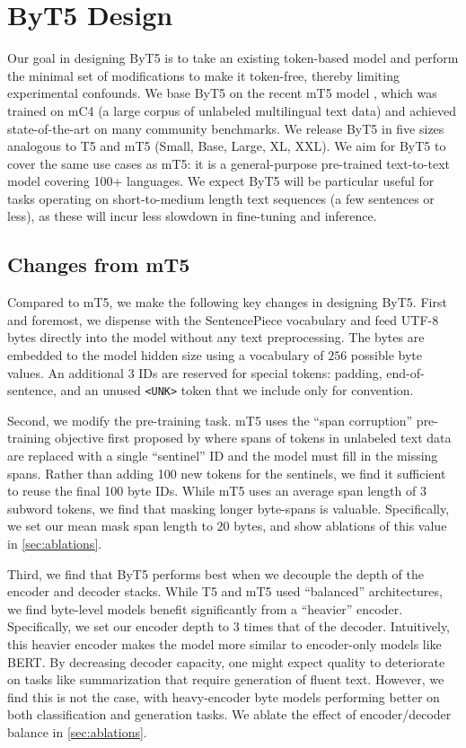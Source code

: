 \documentclass[11pt,a4paper]{article}
\begin{document}
\section{ByT5 Design}
\label{sec:byt5}

Our goal in designing ByT5 is to take an existing token-based model and perform the minimal set of modifications to make it token-free, thereby limiting experimental confounds.
We base ByT5 on the recent mT5 model \cite{mt5}, which was trained on mC4 (a large corpus of unlabeled multilingual text data) and achieved state-of-the-art on many community benchmarks.
We release ByT5 in five sizes analogous to T5 and mT5 (Small, Base, Large, XL, XXL).
We aim for ByT5 to cover the same use cases as mT5: it is a general-purpose pre-trained text-to-text model covering 100+ languages.
We expect ByT5 will be particular useful for tasks operating on short-to-medium length text sequences (a few sentences or less), as these will incur less slowdown in fine-tuning and inference.

\subsection{Changes from mT5}

Compared to mT5, we make the following key changes in designing ByT5. First and foremost, we dispense with the SentencePiece \cite{kudo-richardson-2018-sentencepiece} vocabulary and feed \mbox{UTF-8} bytes directly into the model without any text preprocessing. The bytes are embedded to the model hidden size using a vocabulary of $256$ possible byte values. An additional $3$ IDs are reserved for special tokens: padding, end-of-sentence, and an unused \texttt{<UNK>} token that we include only for convention.

Second, we modify the pre-training task.
mT5 uses the ``span corruption'' pre-training objective first proposed by \citet{raffel-2020-t5} where spans of tokens in unlabeled text data are replaced with a single ``sentinel'' ID and the model must fill in the missing spans.
Rather than adding 100 new tokens for the sentinels, we find it sufficient to reuse the final 100 byte IDs.
While mT5 uses an average span length of $3$ subword tokens, we find that masking longer byte-spans is valuable.
Specifically, we set our mean mask span length to $20$ bytes, and show ablations of this value in \cref{sec:ablations}.

Third, we find that ByT5 performs best when we decouple the depth of the encoder and decoder stacks. While T5 and mT5 used ``balanced'' architectures, we find byte-level models benefit significantly from a ``heavier'' encoder. Specifically, we set our encoder depth to $3$ times that of the decoder. Intuitively, this heavier encoder makes the model more similar to encoder-only models like BERT\@. By decreasing decoder capacity, one might expect quality to deteriorate on tasks like summarization that require generation of fluent text. However, we find this is not the case, with heavy-encoder byte models performing better on both classification and generation tasks. We ablate the effect of encoder/decoder balance in \cref{sec:ablations}.
\end{document}

